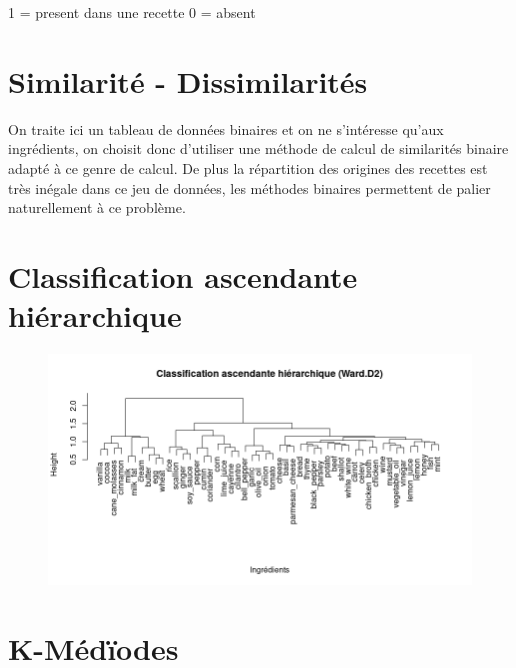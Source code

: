 \documentclass[a4paper, titlepage]{report}
\begin{document}
1 = present dans une recette 
0 = absent

\section{Similarité - Dissimilarités}

On traite ici un tableau de données binaires et on ne s’intéresse qu'aux ingrédients, on choisit donc d'utiliser une méthode de calcul de similarités binaire adapté à ce genre de calcul. De plus la répartition des origines des recettes est très inégale dans ce jeu de données, les méthodes binaires permettent de palier naturellement à ce problème.


\section{Classification ascendante hiérarchique}

\begin{figure}[h]
	\begin{center}
		\includegraphics[scale = 0.45]{./doc/plot-hclust-ingredients.png}
	\end{center}
\end{figure}


\section{K-Médïodes}
\end{document}
